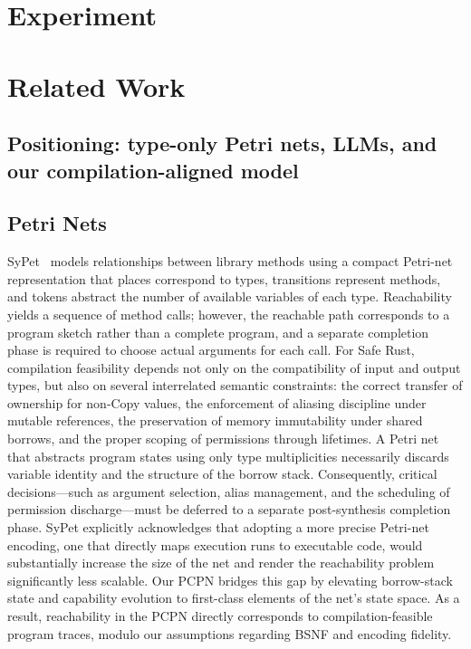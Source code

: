 \documentclass[runningheads]{llncs}
\begin{document}
\section{Experiment}

\section{Related Work}
\subsection{Positioning: type-only Petri nets, LLMs, and our compilation-aligned model}
\label{sec:positioning}
\subsection{Petri Nets}
SyPet~\cite{FengPOPL17SyPet} models relationships between library methods using a compact Petri-net representation that places correspond to types, transitions represent methods, and tokens abstract the number of available variables of each type. Reachability yields a sequence of method calls; however, the reachable path corresponds to a program sketch rather than a complete program, and a separate completion phase is required to choose actual arguments for each call.
For Safe Rust, compilation feasibility depends not only on the compatibility of input and output types, but also on several interrelated semantic constraints: the correct transfer of ownership for non‑Copy values, the enforcement of aliasing discipline under mutable references, the preservation of memory immutability under shared borrows, and the proper scoping of permissions through lifetimes. A Petri net that abstracts program states using only type multiplicities necessarily discards variable identity and the structure of the borrow stack. Consequently, critical decisions—such as argument selection, alias management, and the scheduling of permission discharge—must be deferred to a separate post-synthesis completion phase. SyPet explicitly acknowledges that adopting a more precise Petri-net encoding, one that directly maps execution runs to executable code, would substantially increase the size of the net and render the reachability problem significantly less scalable. Our PCPN bridges this gap by elevating borrow-stack state and capability evolution to first-class elements of the net’s state space. As a result, reachability in the PCPN directly corresponds to compilation-feasible program traces, modulo our assumptions regarding BSNF and encoding fidelity.
\end{document}

